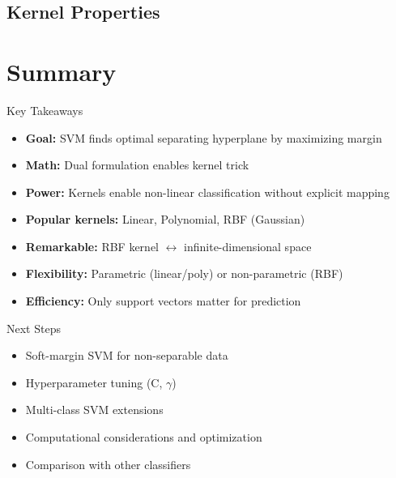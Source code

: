 \documentclass{beamer}
\begin{document}
\subsection{Kernel Properties}

		{
	
}

\section{Summary}

\begin{frame}{Key Takeaways}
\begin{itemize}
	\item \textbf{Goal:} SVM finds optimal separating hyperplane by maximizing margin
	\item \textbf{Math:} Dual formulation enables kernel trick
	\item \textbf{Power:} Kernels enable non-linear classification without explicit mapping
	\item \textbf{Popular kernels:} Linear, Polynomial, RBF (Gaussian)
	\item \textbf{Remarkable:} RBF kernel $\leftrightarrow$ infinite-dimensional space
	\item \textbf{Flexibility:} Parametric (linear/poly) or non-parametric (RBF)
	\item \textbf{Efficiency:} Only support vectors matter for prediction
\end{itemize}
\end{frame}

\begin{frame}{Next Steps}
\begin{itemize}
	\item Soft-margin SVM for non-separable data
	\item Hyperparameter tuning (C, $\gamma$)
	\item Multi-class SVM extensions
	\item Computational considerations and optimization
	\item Comparison with other classifiers
\end{itemize}
\end{frame}
\end{document}
